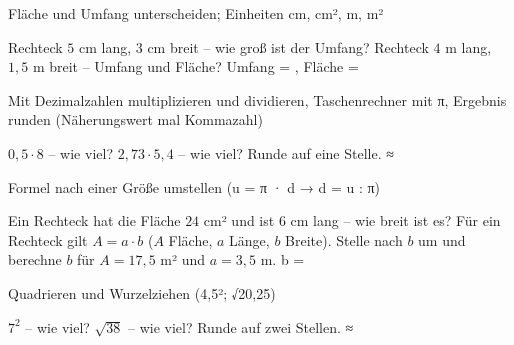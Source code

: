 \setcounter{aufgabe}{0}

\begin{aufgabe}{Fläche und Umfang unterscheiden; Einheiten cm, cm², m, m²}
\begin{teile}
\teil Rechteck $5$ cm lang, $3$ cm breit – wie groß ist der Umfang? \leerfeld[cm]
\teil Rechteck $4$ m lang, $1{,}5$ m breit – Umfang und Fläche? Umfang = \leerfeld[m] , Fläche = \leerfeld[m²]
\end{teile}
\end{aufgabe}

\begin{aufgabe}{Mit Dezimalzahlen multiplizieren und dividieren, Taschenrechner mit π, Ergebnis runden (Näherungswert mal Kommazahl)}
\begin{teile}
\teil $0{,}5 \cdot 8$ – wie viel? \leerfeld
\teil $2{,}73 \cdot 5{,}4$ – wie viel? Runde auf eine Stelle. ≈ \leerfeld
\end{teile}
\end{aufgabe}

\begin{aufgabe}{Formel nach einer Größe umstellen (u = π · d → d = u : π)}
\begin{teile}
\teil Ein Rechteck hat die Fläche $24$ cm² und ist $6$ cm lang – wie breit ist es? \leerfeld[cm]
\teil Für ein Rechteck gilt $A = a \cdot b$ ($A$ Fläche, $a$ Länge, $b$ Breite). Stelle nach $b$ um und berechne $b$ für $A = 17{,}5$ m² und $a = 3{,}5$ m. b = \leerfeld[m]
\end{teile}
\end{aufgabe}

\begin{aufgabe}{Quadrieren und Wurzelziehen (4,5²; √20,25)}
\begin{teile}
\teil $7^2$ – wie viel? \leerfeld
\teil $\sqrt{38}$ – wie viel? Runde auf zwei Stellen. ≈ \leerfeld
\end{teile}
\end{aufgabe}

